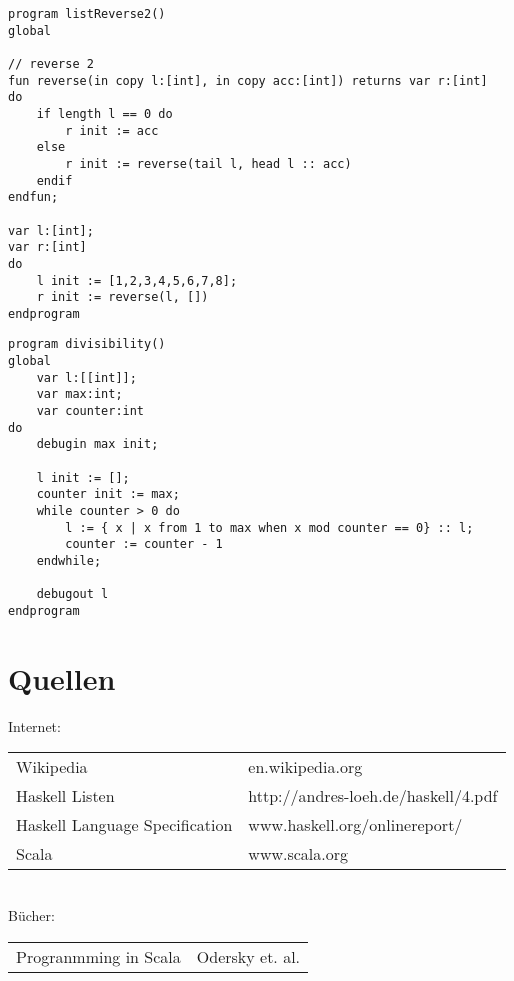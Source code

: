 \documentclass[a4paper,notitlepage,oneside]{article}
\begin{document}
\newpage
\begin{lstlisting}[language=iml, caption=Liste reverse 2]
program listReverse2()
global

// reverse 2
fun reverse(in copy l:[int], in copy acc:[int]) returns var r:[int]
do
	if length l == 0 do
		r init := acc
	else
		r init := reverse(tail l, head l :: acc)
	endif
endfun;

var l:[int];
var r:[int]
do
	l init := [1,2,3,4,5,6,7,8];
	r init := reverse(l, [])
endprogram
\end{lstlisting}

\begin{lstlisting}[language=iml, caption=Teilbarkeit]
program divisibility() 
global 
	var l:[[int]];
	var max:int;
	var counter:int
do 
	debugin max init;
	
	l init := [];
	counter init := max;
	while counter > 0 do
		l := { x | x from 1 to max when x mod counter == 0} :: l;
		counter := counter - 1
	endwhile;
	
	debugout l
endprogram
\end{lstlisting}

\section{Quellen}
Internet:\\
\begin{tabular}{l l}
Wikipedia & en.wikipedia.org \\
Haskell Listen  & http://andres-loeh.de/haskell/4.pdf \\
Haskell Language Specification & www.haskell.org/onlinereport/ \\
Scala & www.scala.org
\end{tabular} \\
Bücher: \\
\begin{tabular}{l l}
Progranmming in Scala & Odersky et. al. \\
\end{tabular}
\end{document}
